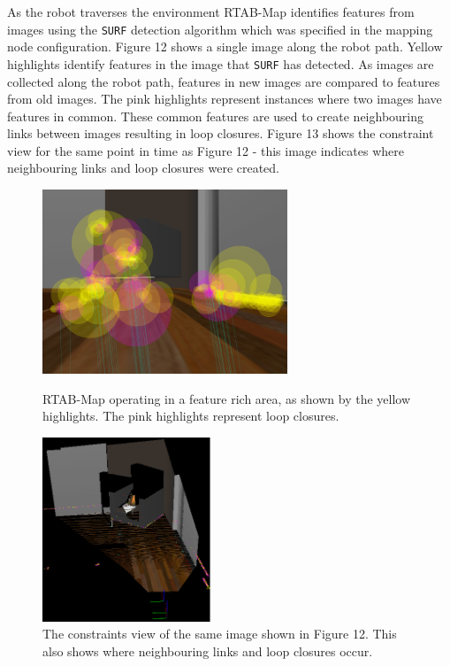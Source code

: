\documentclass[a4paper]{article}
\begin{document}
As the robot traverses the environment RTAB-Map identifies features from images using the \texttt{SURF} detection algorithm which was specified in the mapping node configuration. Figure 12 shows a single image along the robot path. Yellow highlights identify features in the image that \texttt{SURF} has detected. As images are collected along the robot path, features in new images are compared to features from old images. The pink highlights represent instances where two images have features in common. These common features are used to create neighbouring links between images resulting in loop closures. Figure 13 shows the constraint view for the same point in time as Figure 12 - this image indicates where neighbouring links and loop closures were created.
\begin{figure}[h]
\centering
\begin{minipage}[t]{0.45\textwidth}
\centering
\includegraphics[height=5.5cm]{kitchen_features}
\caption{RTAB-Map operating in a feature rich area, as shown by the yellow highlights. The pink highlights represent loop closures.}
\end{minipage}
\hspace{1cm}
\begin{minipage}[t]{0.45\textwidth}
\centering
\includegraphics[height=5.5cm]{kitchen_constraints}
\caption{The constraints view of the same image shown in Figure 12. This also shows where neighbouring links and loop closures occur.}
\end{minipage}
\end{figure}
\end{document}
